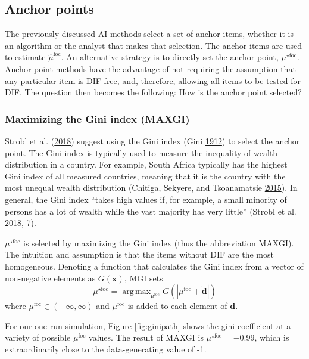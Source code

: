 \documentclass[
  11pt,
]{article}
\begin{document}
\hypertarget{anchor-points}{%
\subsection{Anchor points}\label{anchor-points}}

The previously discussed AI methods select a set of anchor items, whether it is an algorithm or the analyst that makes that selection. The anchor items are used to estimate \(\hat \mu^\text{foc}\). An alternative strategy is to directly set the anchor point, \(\mu^{\star\text{foc}}\). Anchor point methods have the advantage of not requiring the assumption that any particular item is DIF-free, and, therefore, allowing all items to be tested for DIF. The question then becomes the following: How is the anchor point selected?

\hypertarget{maximizing-the-gini-index-maxgi}{%
\subsubsection{Maximizing the Gini index (MAXGI)}\label{maximizing-the-gini-index-maxgi}}

Strobl et al. (\protect\hyperlink{ref-strobl2018anchor}{2018}) suggest using the Gini index (Gini \protect\hyperlink{ref-gini1912variabilita}{1912}) to select the anchor point. The Gini index is typically used to measure the inequality of wealth distribution in a country. For example, South Africa typically has the highest Gini index of all measured countries, meaning that it is the country with the most unequal wealth distribution (Chitiga, Sekyere, and Tsoanamatsie \protect\hyperlink{ref-chitiga2015income}{2015}). In general, the Gini index \enquote{takes high values if, for example, a small minority of persons has a lot of wealth while the vast majority has very little} (Strobl et al. \protect\hyperlink{ref-strobl2018anchor}{2018}, 7).

\(\mu^{\star\text{foc}}\) is selected by maximizing the Gini index (thus the abbreviation MAXGI). The intuition and assumption is that the items without DIF are the most homogeneous. Denoting a function that calculates the Gini index from a vector of non-negative elements as \(G(\mathbf{x})\), MGI sets
\[
\mu^{\star\text{foc}} = \mathop\mathrm{arg\,max}_{\mu^\text{foc}} G(|\mu^\text{foc} + \tilde{\mathbf{d}}|)
\]
where \(\mu^\text{foc} \in (-\infty, \infty)\) and \(\mu^\text{foc}\) is added to each element of \(\mathbf{d}\).

For our one-run simulation, Figure \ref{fig:ginipath} shows the gini coefficient at a variety of possible \(\mu^\text{foc}\) values. The result of MAXGI is \(\mu^{\star\text{foc}} = -0.99\), which is extraordinarily close to the data-generating value of -1.
\end{document}
